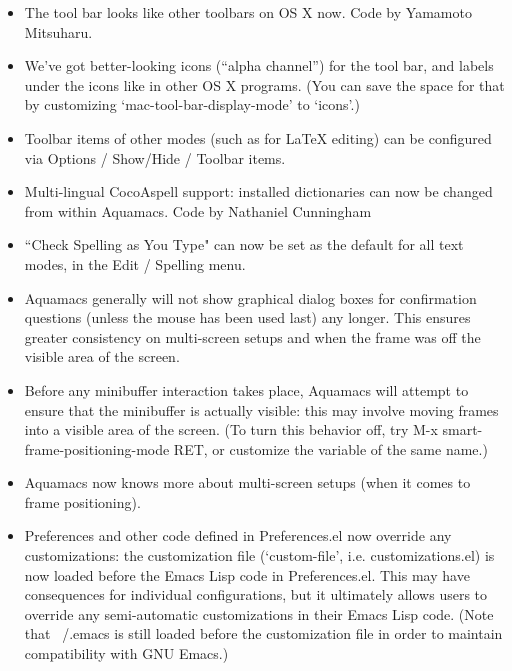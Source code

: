 \begin{itemize}
\item The tool bar looks like other toolbars on OS X now. Code by Yamamoto Mitsuharu.

\item We've got better-looking icons (``alpha channel'') for the tool bar, and labels under the icons like in other OS X programs. (You can save the space for that by customizing `mac-tool-bar-display-mode' to `icons'.)

\item Toolbar items of other modes (such as for LaTeX editing) can be configured via Options / Show/Hide / Toolbar items.

\item Multi-lingual CocoAspell support: installed dictionaries can now be changed from within Aquamacs.
Code by Nathaniel Cunningham

\item ``Check Spelling as You Type" can now be set as the default for all text modes, in the Edit / Spelling menu.

\item Aquamacs generally will not show graphical dialog boxes for confirmation questions (unless the mouse has been used last) any longer.  This ensures greater consistency on multi-screen setups and when the frame was off the visible area of the screen.

\item Before any minibuffer interaction takes place, Aquamacs will attempt to ensure that the minibuffer is actually visible: this may involve moving frames into a visible area of the screen.  (To turn this behavior off, try M-x smart-frame-positioning-mode RET, or customize the variable of the same name.)

\item Aquamacs now knows more about multi-screen setups (when it comes to frame positioning). 

\item Preferences and other code defined in Preferences.el now override any customizations: the customization file (`custom-file', i.e. customizations.el) is now loaded before the Emacs Lisp code in Preferences.el.  This may have consequences for individual configurations, but it ultimately allows users to override any semi-automatic customizations in their Emacs Lisp code. (Note that ~/.emacs is still loaded before the customization file in order to maintain compatibility with GNU Emacs.)



\end{itemize}

